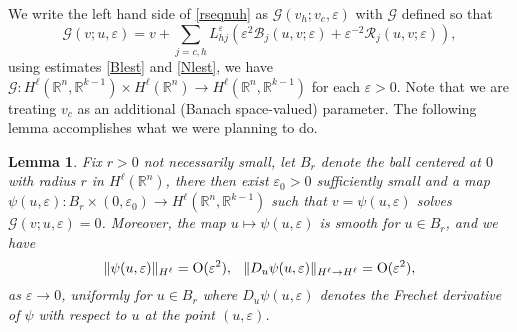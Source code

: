 \documentclass[10pt]{article}
\newtheorem{Lemma}{Lemma}[section]
\newcommand{\R}{\mathbb{R}}
\newcommand{\rmO}{\mathrm{O}}
\newcommand{\eps}{\varepsilon}
\newcommand{\B}{\mathcal{B}}
\newcommand{\G}{\mathcal{G}}
\newcommand{\Rm}{\mathcal{R}}
\begin{document}
We write the left hand side of \eqref{rseqnuh} as $\G(v_h; v_c,\eps)$ with $\G$ defined so that
\[
\G(v;u,\eps) = v+ \sum_{j=c,h} L_{hj}^{\eps}\left( \eps^2\B_j(u,v;\eps)+\eps^{-2}\Rm_j(u,v;\eps) \right), 
\]
using estimates \eqref{Blest} and \eqref{Nlest}, we have $\G : H^\ell(\R^n,\R^{k-1}) \times H^\ell(\R^n) \to H^\ell(\R^n,\R^{k-1})$ for each $\eps >0$.
Note that we are treating $v_c$ as an additional (Banach space-valued) parameter. The following lemma accomplishes what we were planning to do.
\begin{Lemma}\label{Lemuh} Fix $r>0$ not necessarily small, let $B_r$ denote the ball centered at $0$ with radius $r$ in $H^\ell(\R^n)$, there then exist $\eps_0>0$ sufficiently small and a map $\psi(u,\eps): B_r \times (0,\eps_0) \to H^\ell(\R^n,\R^{k-1})$ such that $v = \psi(u, \eps)$ solves $\G(v;u,\eps) = 0$. Moreover, the map $u \mapsto \psi(u,\eps)$ is smooth for $u\in B_r$, and we have 
\[
\|\psi(u,\eps)\|_{H^\ell} = \rmO(\eps^2), \hspace{0.1in}\|D_u\psi(u,\eps)\|_{H^\ell \to H^\ell} = \rmO(\eps^2),
\] as 
$\eps \to 0$, uniformly for $u\in B_r$ where $D_u\psi(u,\eps)$ denotes the Frechet derivative of $\psi$ with respect to $u$ at the point $(u,\eps)$.  \end{Lemma}
\end{document}
